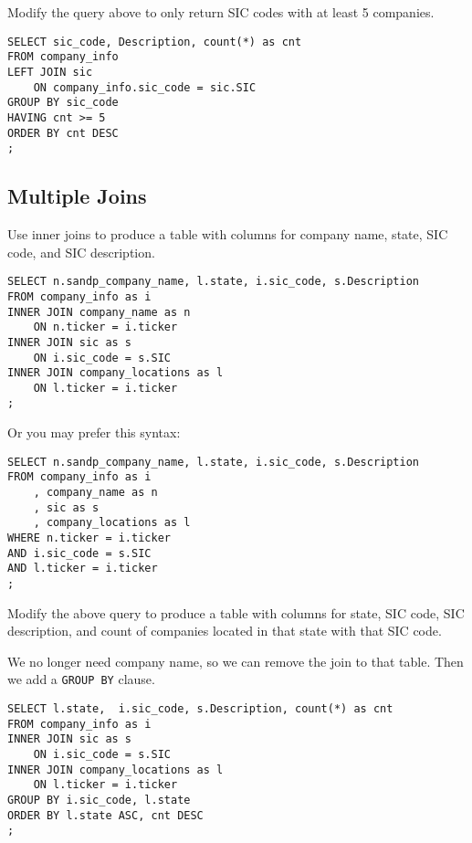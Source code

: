 \documentclass[10pt]{exam}
\begin{document}
\begin{questions}
\question Modify the query above to only return SIC codes with at least
5 companies.

\begin{solution}
\begin{lstlisting}
SELECT sic_code, Description, count(*) as cnt
FROM company_info
LEFT JOIN sic
    ON company_info.sic_code = sic.SIC
GROUP BY sic_code
HAVING cnt >= 5
ORDER BY cnt DESC
;
\end{lstlisting}
\end{solution}



\subsection*{Multiple Joins}

\question Use inner joins to produce a table with columns for company name,
state, SIC code, and SIC description.

\begin{solution}
\begin{lstlisting}
SELECT n.sandp_company_name, l.state, i.sic_code, s.Description
FROM company_info as i
INNER JOIN company_name as n
    ON n.ticker = i.ticker
INNER JOIN sic as s
    ON i.sic_code = s.SIC
INNER JOIN company_locations as l
    ON l.ticker = i.ticker
;
\end{lstlisting}

Or you may prefer this syntax:

\begin{lstlisting}
SELECT n.sandp_company_name, l.state, i.sic_code, s.Description
FROM company_info as i
    , company_name as n
    , sic as s 
    , company_locations as l 
WHERE n.ticker = i.ticker
AND i.sic_code = s.SIC
AND l.ticker = i.ticker
;
\end{lstlisting}
\end{solution}


\question Modify the above query to 
produce a table with columns for state, SIC
code, SIC description, and count of companies located in that state
with that SIC code.

\begin{solution}

    We no longer need company name, so we can remove the join to that
    table. Then we add a \texttt{GROUP BY} clause.

\begin{lstlisting}
SELECT l.state,  i.sic_code, s.Description, count(*) as cnt
FROM company_info as i
INNER JOIN sic as s
    ON i.sic_code = s.SIC
INNER JOIN company_locations as l
    ON l.ticker = i.ticker
GROUP BY i.sic_code, l.state
ORDER BY l.state ASC, cnt DESC
;
\end{lstlisting}
\end{solution}



\end{questions}
\end{document}
